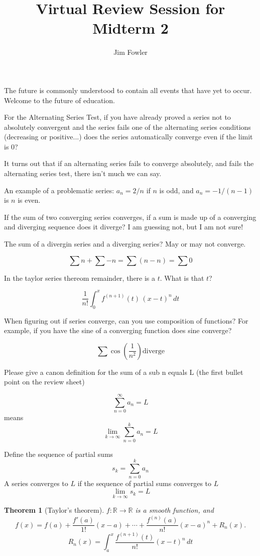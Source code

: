 \documentclass{article}
\title{Virtual Review Session for Midterm 2}
\author{Jim Fowler}
\newtheorem*{theorem}{Theorem}
\theoremstyle{definition}
\newcommand{\R}{\mathbb{R}}
\begin{document}
\setlength{\parindent}{0in}
\pagecolor{black}
\color{white}


The future is commonly understood to contain all events that have yet to occur.
Welcome to the future of education.

For the Alternating Series Test, if you have already proved a series not to absolutely convergent and the series fails one of the alternating series conditions (decreasing or positive...) does the series automatically converge even if the limit is 0?

It turns out that if an alternating series fails to converge absolutely, and fails the alternating series test, there isn't much we can say.

An example of a problematic series:
$a_n = 2/n$ if $n$ is odd, and $a_n = -1/(n-1)$ is $n$ is even.

If the sum of two converging series converges, if a sum is made up of a converging and diverging sequence does it diverge? I am guessing not, but I am not sure!

The sum of a divergin series and a diverging series?  May or may not converge.

$$
\sum n + \sum -n = \sum (n-n) = \sum 0
$$

In the taylor series thereom remainder, there is a $t$. What is that $t$?

$$
\frac{1}{n!} \int_0^x f^{(n+1)} (t)\, (x - t)^n \, dt
$$

When figuring out if series converge, can you use composition of
functions? For example, if you have the sine of a converging function
does sine converge?

$$
\sum \cos\left(\frac{1}{n^2}\right) \mbox{diverge}
$$

Please give a canon definition for the sum of a sub n equals L (the
first bullet point on the review sheet)

$$
\sum_{n=0}^\infty a_n = L
$$
means
$$
\lim_{k \to \infty} \sum_{n=0}^k a_n = L
$$

Define the sequence of partial sums
$$
s_k = \sum_{n=0}^k a_n
$$
A series converges to $L$ if the sequence of partial sums converges to $L$
$$
\lim_{k \to \infty} s_k = L
$$

\begin{theorem}[Taylor's theorem]
$f : \R \to \R$ is a smooth function, and
$$ f(x) = f(a) + \frac{f'(a)}{1!}(x - a) + \cdots + \frac{f^{(n)}(a)}{n!}(x - a)^n + R_n(x). $$
 $$ R_n(x) = \int_a^x \frac{f^{(n+1)} (t)}{n!} (x - t)^n \, dt$$
\end{theorem}
\end{document}
